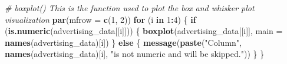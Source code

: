 \documentclass[
]{article}
\newenvironment{Shaded}{\begin{snugshade}}{\end{snugshade}}
\newcommand{\AttributeTok}[1]{\textcolor[rgb]{0.13,0.29,0.53}{#1}}
\newcommand{\CommentTok}[1]{\textcolor[rgb]{0.56,0.35,0.01}{\textit{#1}}}
\newcommand{\ControlFlowTok}[1]{\textcolor[rgb]{0.13,0.29,0.53}{\textbf{#1}}}
\newcommand{\DecValTok}[1]{\textcolor[rgb]{0.00,0.00,0.81}{#1}}
\newcommand{\FunctionTok}[1]{\textcolor[rgb]{0.13,0.29,0.53}{\textbf{#1}}}
\newcommand{\NormalTok}[1]{#1}
\newcommand{\SpecialCharTok}[1]{\textcolor[rgb]{0.81,0.36,0.00}{\textbf{#1}}}
\newcommand{\StringTok}[1]{\textcolor[rgb]{0.31,0.60,0.02}{#1}}
\begin{document}
\begin{Shaded}
\begin{Highlighting}[]
\CommentTok{\# \textasciigrave{}boxplot()\textasciigrave{} This is the function used to plot the box and whisker plot visualization}
\FunctionTok{par}\NormalTok{(}\AttributeTok{mfrow =} \FunctionTok{c}\NormalTok{(}\DecValTok{1}\NormalTok{, }\DecValTok{2}\NormalTok{))}
\ControlFlowTok{for}\NormalTok{ (i }\ControlFlowTok{in} \DecValTok{1}\SpecialCharTok{:}\DecValTok{4}\NormalTok{) \{}
  \ControlFlowTok{if}\NormalTok{ (}\FunctionTok{is.numeric}\NormalTok{(advertising\_data[[i]])) \{}
    \FunctionTok{boxplot}\NormalTok{(advertising\_data[[i]], }\AttributeTok{main =} \FunctionTok{names}\NormalTok{(advertising\_data)[i])}
\NormalTok{  \} }\ControlFlowTok{else}\NormalTok{ \{}
    \FunctionTok{message}\NormalTok{(}\FunctionTok{paste}\NormalTok{(}\StringTok{"Column"}\NormalTok{, }\FunctionTok{names}\NormalTok{(advertising\_data)[i], }\StringTok{"is not numeric and will be skipped."}\NormalTok{))}
\NormalTok{  \}}
\NormalTok{\}}
\end{Highlighting}
\end{Shaded}
\end{document}
